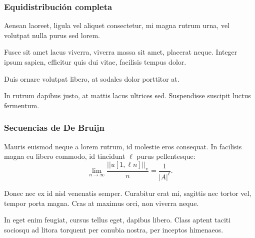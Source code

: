 \documentclass[t, 10pt, mathserif]{beamer}
\newcommand{\alocc}[2]{|\!|#1|\!|_{#2}}
\begin{document}

\begin{frame}
  \frametitle{Equidistribución completa}

  Aenean laoreet, ligula vel aliquet consectetur, mi magna rutrum urna, vel volutpat nulla purus sed lorem.
  \pause

  \medskip
  \begin{definition}
    Fusce sit amet lacus viverra, viverra massa sit amet, placerat neque. Integer ipsum sapien, efficitur quis dui vitae, facilisis tempus dolor.
    \pause

    Duis ornare volutpat libero, at sodales dolor porttitor at.
    \pause
  \end{definition}

  In rutrum dapibus justo, at mattis lacus ultrices sed. Suspendisse suscipit luctus fermentum.
\end{frame}



\begin{frame}
  \frametitle{Secuencias de De Bruijn}

  \medskip
  \begin{definition}
    Mauris euismod neque a lorem rutrum, id molestie eros consequat. In facilisis magna eu libero commodo, id tincidunt {\color{magenta} $\ell$} purus pellentesque:
    \begin{equation*}
      \lim_{n \rightarrow \infty} \frac{\alocc{u[1,\ell n]}{v}}{n} = \frac{1}{|A|^{\ell}}.  
    \end{equation*}
    \pause

    Donec nec ex id nisl venenatis semper. Curabitur erat mi, sagittis nec tortor vel, tempor porta magna. Cras at maximus orci, non viverra neque.
  \end{definition}
  \pause

  \medskip
  \begin{problem}
    In eget enim feugiat, cursus tellus eget, dapibus libero. Class aptent taciti sociosqu ad litora torquent per conubia nostra, per inceptos himenaeos.
  \end{problem}
\end{frame}

\end{document}
